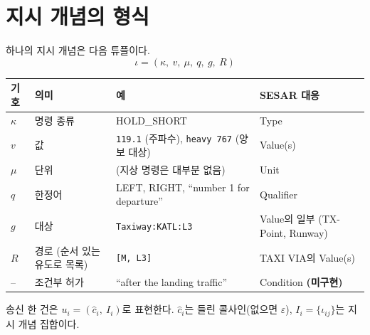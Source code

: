 \documentclass[10pt,a4paper]{article}
\newcommand{\cmd}[1]{\textsf{\small #1}}
\begin{document}
\section{지시 개념의 형식}
하나의 지시 개념은 다음 튜플이다.
\begin{equation*}
\iota = (\kappa,\ v,\ \mu,\ q,\ g,\ R)
\end{equation*}
\begin{center}\small
\begin{tabular}{@{}l l l l@{}}
\toprule
기호 & 의미 & 예 & SESAR 대응 \cite{helmke2018}\\\midrule
$\kappa$ & 명령 종류 & \cmd{HOLD\_SHORT} & Type\\
$v$ & 값 & \texttt{119.1} (주파수), \texttt{heavy 767} (양보 대상) & Value(s)\\
$\mu$ & 단위 & (지상 명령은 대부분 없음) & Unit\\
$q$ & 한정어 & \cmd{LEFT}, \cmd{RIGHT}, ``number 1 for departure'' & Qualifier\\
$g$ & 대상 & \texttt{Taxiway:KATL:L3} & Value의 일부 (TX-Point, Runway)\\
$R$ & 경로 (순서 있는 유도로 목록) & \texttt{[M, L3]} & TAXI VIA의 Value(s)\\
-- & 조건부 허가 & ``after the landing traffic'' & Condition \textbf{(미구현)}\\
\bottomrule
\end{tabular}
\end{center}
송신 한 건은 $u_i = (\hat c_i,\ I_i)$로 표현한다. $\hat c_i$는 들린 콜사인(없으면 $\varepsilon$), $I_i = \{\iota_{ij}\}$는 지시 개념 집합이다.

\end{document}
